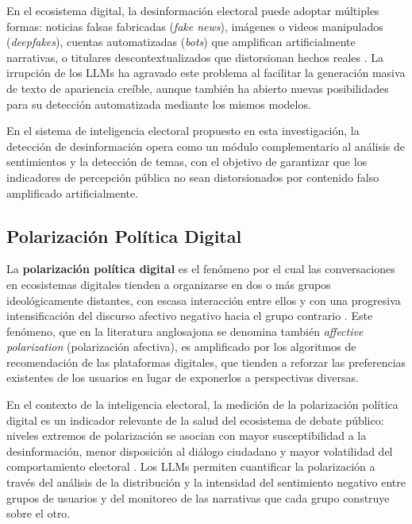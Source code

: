 \documentclass[listof=nochaptergap,12pt,times,authoryear]{report}
\begin{document}
En el ecosistema digital, la desinformación electoral puede adoptar múltiples formas: noticias falsas fabricadas (\textit{fake news}), imágenes o videos manipulados (\textit{deepfakes}), cuentas automatizadas (\textit{bots}) que amplifican artificialmente narrativas, o titulares descontextualizados que distorsionan hechos reales \parencite{pr_chen2024combating_misinformation}. La irrupción de los LLMs ha agravado este problema al facilitar la generación masiva de texto de apariencia creíble, aunque también ha abierto nuevas posibilidades para su detección automatizada mediante los mismos modelos.
 
En el sistema de inteligencia electoral propuesto en esta investigación, la detección de desinformación opera como un módulo complementario al análisis de sentimientos y la detección de temas, con el objetivo de garantizar que los indicadores de percepción pública no sean distorsionados por contenido falso amplificado artificialmente.
 
\subsection{Polarización Política Digital}
 
La \textbf{polarización política digital} es el fenómeno por el cual las conversaciones en ecosistemas digitales tienden a organizarse en dos o más grupos ideológicamente distantes, con escasa interacción entre ellos y con una progresiva intensificación del discurso afectivo negativo hacia el grupo contrario \parencite{mc_iyengar2019origins}. Este fenómeno, que en la literatura anglosajona se denomina también \textit{affective polarization} (polarización afectiva), es amplificado por los algoritmos de recomendación de las plataformas digitales, que tienden a reforzar las preferencias existentes de los usuarios en lugar de exponerlos a perspectivas diversas.
 
En el contexto de la inteligencia electoral, la medición de la polarización política digital es un indicador relevante de la salud del ecosistema de debate público: niveles extremos de polarización se asocian con mayor susceptibilidad a la desinformación, menor disposición al diálogo ciudadano y mayor volatilidad del comportamiento electoral \parencite{mc_iyengar2019origins}. Los LLMs permiten cuantificar la polarización a través del análisis de la distribución y la intensidad del sentimiento negativo entre grupos de usuarios y del monitoreo de las narrativas que cada grupo construye sobre el otro.
 
\end{document}
